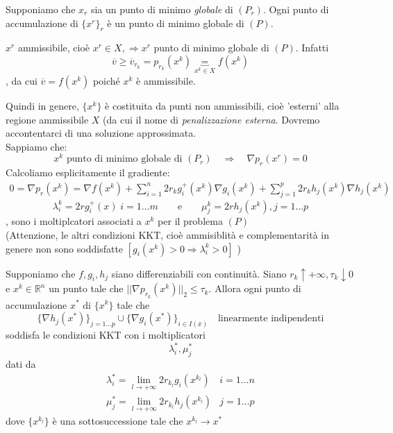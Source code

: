 \begin{proposition}
  Supponiamo che $x_r$ sia un punto di minimo
 \emph{globale} di $(P_r)$.
Ogni punto di accumulazione di $\{x^r\}_r$ \`e
un punto di minimo globale di $(P)$.
\end{proposition}
\begin{observation}
$x^{r}$ ammissibile, cio\`e $x^{r} \in X, \Rightarrow x^{r}$ punto
di minimo globale di $(P)$. Infatti
$$ \overline{v} \geq \overline{v}_{r_k} = p_{r_k}(x^k) 
\underbracket{=}_{x^{k} \in X}  f(x^{k})$$, da cui
$\overline{v} = f(x^{k})$ poich\'e $x^{k}$ \`e ammissibile.
\end{observation}
Quindi in genere, $\{x^{k} \}$ \`e costituita da punti
non ammissibili, cio\`e 'esterni' alla regione
ammissibile $X$ (da cui il nome di \emph{penalizzazione esterna}.
Dovremo accontentarci di una soluzione approssimata.\\
Sappiamo che:
$$ x^{k} \text{ punto di minimo globale di } (P_r) \quad
\Rightarrow \quad \nabla p_r(x^{r}) = 0 $$
Calcoliamo esplicitamente il gradiente:
$$
\begin{array}{l}
0 =  \nabla p_r(x^{k}) = 
\nabla f(x^{k}) +
\displaystyle \sum_{i=1}^{n} 2r_k g_i^{+}(x^{k})
\nabla g_i(x^{k}) + \displaystyle \sum_{j=1}^{p} 2r_k h_j(x^{k})
\nabla h_j(x^{k})
\end{array}
$$
$$ \lambda_i^{k} =  2rg_i^{+}(x) \; i=1\ldots m
\qquad  \text{e} \qquad
\mu_j^{k} = 2r h_j(x^k) , j=1\ldots p$$,
 sono i moltiplcatori associati
a $x^{k}$ per il problema $(P)$ \\
 (Attenzione, le altri condizioni
KKT, cio\`e ammisiblit\`a e complementarit\`a in genere
non sono soddisfatte $[g_i(x^{k}) > 0 \Rightarrow \lambda_i^{k} > 0 ]$
)
\begin{theo}
Supponiamo che $f, g_i, h_j$ siano differenziabili
con continuit\`a. Siano
$r_k \uparrow + \infty, \tau_k \downarrow 0$ e
$x^{k} \in \mathbb{R}^{n}$ un punto tale che
$||\nabla p_{r_k}(x^{k})||_{2} \leq \tau_k$.
Allora ogni punto di accumulazione $x^{*}$ di
$\{x^{k}\}$ tale che
$$
\{ \nabla h_j(x^{*}) \}_{j=1\ldots p}  \cup
\{ \nabla g_i(x^{*}) \}_{i \in I(\overline{x})}
\quad \text{linearmente indipendenti}
$$
soddisfa le condizioni
KKT con i moltiplicatori
$$ \lambda_i^{*}, \mu_j^{*}$$
dati da
$$
\begin{array}{ll}
\displaystyle \lambda_i^{*} = \lim_{l \to + \infty}
2r_{{k}_l} g_i(x^{k_l})  &  i =1 \ldots n \\
\displaystyle \mu_{j}^{*} = \lim_{l \to + \infty} 2r_{k_{l}}
h_j(x^{k_l}) & j =1 \ldots p
\end{array}
 $$
dove $\{x^{k_l}\}$ \`e una sottosuccessione tale che
$x^{k_l} \rightarrow x^{*} $
\end{theo}

